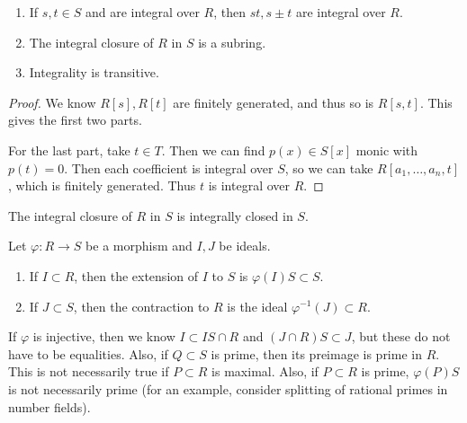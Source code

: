 \documentclass[10pt, twoside]{article}
\begin{document}
        \begin{cor} \begin{enumerate} \item If $s,t \in S$ and are integral
            over $R$, then $st,s\pm t$ are integral over $R$.  \item The
        integral closure of $R$ in $S$ is a subring.  \item Integrality is
    transitive.  \end{enumerate} \begin{proof} We know $R[s],R[t]$ are finitely
    generated, and thus so is $R[s,t]$. This gives the first two parts.

                For the last part, take $t \in T$. Then we can find $p(x) \in
            S[x]$ monic with $p(t) = 0$. Then each coefficient is integral over
        $S$, so we can take $R[a_1, \ldots, a_n,t]$, which is finitely
    generated. Thus $t$ is integral over $R$.  \end{proof} \end{cor}

        \begin{cor} The integral closure of $R$ in $S$ is integrally closed in
        $S$.  \end{cor}
               
        \begin{defn} Let $\varphi:R \to S$ be a morphism and $I,J$ be ideals.
            \begin{enumerate} \item If $I \subset R$, then the extension of $I$
                to $S$ is $\varphi(I)S \subset S$.  \item If $J \subset S$,
                then the contraction to $R$ is the ideal $\varphi^{-1}(J)
                \subset R$.  \end{enumerate} \end{defn}

        If $\varphi$ is injective, then we know $I \subset IS \cap R$ and $(J
        \cap R)S \subset J$, but these do not have to be equalities. Also, if
        $Q \subset S$ is prime, then its preimage is prime in $R$. This is not
        necessarily true if $P \subset R$ is maximal. Also, if $P \subset R$ is
        prime, $\varphi(P)S$ is not necessarily prime (for an example, consider
        splitting of rational primes in number fields).
        
\end{document}
